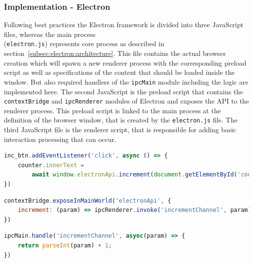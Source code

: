 \subsubsection{Implementation - Electron}
\label{subsubsec:impl:electron}
Following best practices the Electron framework is divided into three JavaScript files, whereas the main process \\(\texttt{electron.js}) represents core process as described in section~\ref{subsec:electron:architecture}.
This file contains the actual browser creation which will spawn a new renderer process  with the corresponding preload script as well as specifications of the content that should be loaded inside the window.
But also required handlers of the \texttt{ipcMain} module including the logic are implemented here.
The second JavaScript is the preload script that contains the \texttt{contextBridge}  and \texttt{ipcRenderer} modules of Electron and exposes the API to the renderer process.
This preload script is linked to the main process at the definition of the browser window, that is created by the \texttt{electron.js} file.
The third JavaScript file is the renderer script, that is responsible for adding basic interaction processing that can occur.
\newpage
\begin{lstlisting}[language=JavaScript,label={lst:rendererjs}, caption={Excerpt of render.js}]
inc_btn.addEventListener('click', async () => {
    counter.innerText =
        await window.electronApi.increment(document.getElementById('counter').innerText)
})
\end{lstlisting}
\begin{lstlisting}[language=JavaScript,label={lst:preloadjs}, caption={Excerpt of preload.js}]
contextBridge.exposeInMainWorld('electronApi', {
    increment: (param) => ipcRenderer.invoke('incrementChannel', param)
})
\end{lstlisting}
\begin{lstlisting}[language=JavaScript,label={lst:electronjs}, caption={Excerpt of electron.js}]
ipcMain.handle('incrementChannel', async(param) => {
    return parseInt(param) + 1;
})
\end{lstlisting}

